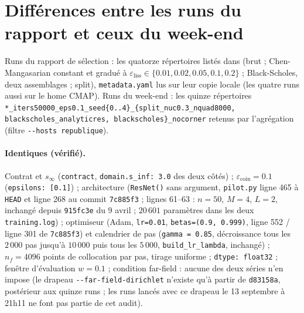 \documentclass[11pt]{article}
\newcommand{\epscoin}{\varepsilon_{\mathrm{coin}}}
\newcommand{\epsliss}{\varepsilon_{\mathrm{liss}}}
\newcommand{\code}[1]{\texttt{#1}}
\begin{document}
\section{Différences entre les runs du rapport et ceux du week-end}
\label{sec:differences}

Runs du rapport de sélection : les quatorze répertoires
 listés dans
 (brut ;
Chen-Mangasarian constant et gradué à $\epsliss\in\{0.01,0.02,0.05,0.1,0.2\}$ ;
Black-Scholes, deux assemblages ; split), \code{metadata.yaml} lus sur leur
copie locale (les quatre runs  aussi sur le home CMAP). Runs du week-end : les quinze
répertoires \code{*\_iters50000\_eps0.1\_seed\{0..4\}\_\{split\_nuc0.3\_nquad8000,
blackscholes\_analyticres, blackscholes\}\_nocorner} retenus par l'agrégation
(filtre \code{-{}-hosts republique}).

\paragraph{Identiques (vérifié).} Contrat et $s_\infty$ (\code{contract},
\code{domain.s\_inf: 3.0} des deux côtés) ; $\epscoin=0.1$ (\code{epsilons:
[0.1]}) ; architecture (\code{ResNet()} sans argument, \code{pilot.py}
ligne 465 à \code{HEAD} et ligne 268 au commit \code{7c885f3} ;
 lignes 61--63 : $n=50$,
$M=4$, $L=2$, inchangé depuis \code{915fc3e} du 9 avril ; $20\,601$ paramètres
dans les deux \code{training.log}) ; optimiseur (Adam, \code{lr=0.01},
\code{betas=(0.9, 0.999)}, ligne 552 / ligne 301 de \code{7c885f3}) et
calendrier de pas (\code{gamma = 0.85}, décroissance tous les $2\,000$ pas
jusqu'à $10\,000$ puis tous les $5\,000$, \code{build\_lr\_lambda}, inchangé) ;
$n_f=4096$ points de collocation par pas, tirage uniforme ; \code{dtype:
float32} ; fenêtre d'évaluation $w=0.1$ ; condition far-field : aucune des
deux séries n'en impose (le drapeau \code{-{}-far-field-dirichlet} n'existe qu'à
partir de \code{d83158a}, postérieur aux quinze runs ; les runs lancés avec ce
drapeau le 13 septembre à 21h11 ne font pas partie de cet audit).
\end{document}
